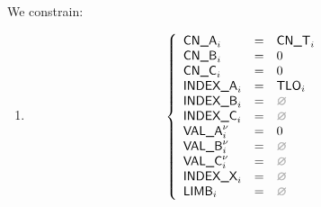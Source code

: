 \begin{center}
\end{center}

We constrain:
\begin{enumerate}
	\item 
		\[
			\left\{ \begin{array}{lclr}
				\cnA      _{i}       & = & \cnT_{i}     \\
				\cnB      _{i}       & = & 0            \\
				\cnC      _{i}       & = & 0            \\
				\indexA   _{i}       & = & \tlo_{i}     \\
				\indexB   _{i}       & = & \nothing     \\
				\indexC   _{i}       & = & \nothing     \\
				\valA     _{i}\new{} & = & 0            \\
				\valB     _{i}\new{} & = & \nothing     \\
				\valC     _{i}\new{} & = & \nothing     \\
				\indexX   _{i}       & = & \nothing     \\
				\limb     _{i}       & = & \nothing     \\
			\end{array} \right.
		\]
\end{enumerate}
